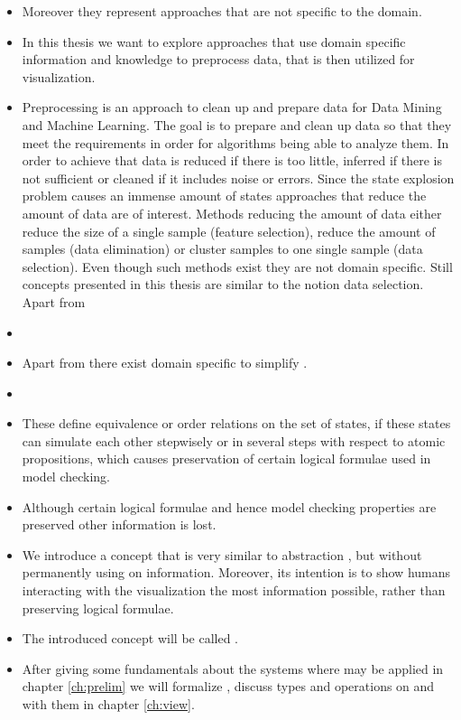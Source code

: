 \documentclass[preview]{standalone}
\begin{document}
\begin{itemize}
	\item Moreover they represent approaches that are not specific to the domain.
	\item In this thesis we want to explore approaches that use domain specific information and knowledge to preprocess data, that is then utilized for visualization.
	\item Preprocessing is an approach to clean up and prepare data for Data Mining and Machine Learning. The goal is to prepare and clean up data so that they meet the requirements in order for algorithms being able to analyze them. In order to achieve that data is reduced if there is too little, inferred if there is not sufficient or cleaned if it includes noise or errors. Since the state explosion problem causes an immense amount of states approaches that reduce the amount of data are of interest. Methods reducing the amount of data either reduce the size of a single sample (feature selection), reduce the amount of samples (data elimination) or cluster samples to one single sample (data selection)\cite{Famili1997,Garcia2016}. Even though such methods exist they are not domain specific. Still concepts presented in this thesis are similar to the notion data selection.
	Apart from
	\item {}
	\item Apart from  there exist domain specific to simplify \mdpsN. 
	\item 
	\item These define equivalence or order relations on the set of states, if these states can simulate each other stepwisely or in several steps with respect to atomic propositions, which causes preservation of certain logical formulae used in model checking.
	\item Although certain logical formulae and hence model checking properties are preserved other information is lost.  
	\item We introduce a concept that is very similar to abstraction \cite[pp. 499]{Baier2008}, but without permanently using on information. Moreover, its intention is to show humans interacting with the visualization the most information possible, rather than preserving logical formulae.
	\item The introduced concept will be called \viewN.
	\item After giving some fundamentals about the systems where \viewsN may be applied in chapter \ref{ch:prelim} we will formalize \viewsN, discuss types and operations on and with them in chapter \ref{ch:view}.

\end{itemize}
\end{document}
